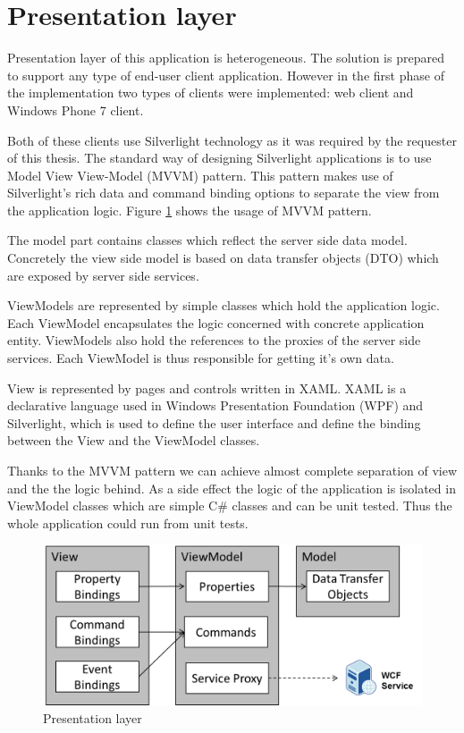 \section{Presentation layer}
Presentation layer of this application is heterogeneous. The solution is prepared to support any type of end-user client application. However in the first phase of the implementation two types of clients were implemented: web client and Windows Phone 7 client.

Both of these clients use Silverlight technology as it was required by the requester of this thesis. The standard way of designing Silverlight applications is to use Model View View-Model (MVVM) pattern. This pattern makes use of Silverlight's rich data and command binding options to separate the view from the application logic. Figure \ref{fig:preslayer} shows the usage of MVVM pattern.

The model part contains classes which reflect the server side data model. Concretely the view side model is based on data transfer objects (DTO) which are exposed by server side services.

ViewModels are represented by simple classes which hold the application logic. Each ViewModel encapsulates the logic concerned with concrete application entity. ViewModels also hold the references to the proxies of the server side services. Each ViewModel is thus responsible for getting it's own data.

View is represented by pages and controls written in XAML. XAML is a declarative language used in Windows Presentation Foundation (WPF) and Silverlight, which is used to define the user interface and define the binding between the View and the ViewModel classes.

Thanks to the MVVM pattern we can achieve almost complete separation of view and the the logic behind. As a side effect the logic of the application is isolated in ViewModel classes which are simple C\# classes and can be unit tested. Thus the whole application could run from unit tests.

\begin{figure}[h]
\begin{center}
\includegraphics[width=14cm]{figures/presentation_layer}
\caption{Presentation layer}
\label{fig:preslayer}
\end{center}
\end{figure}

